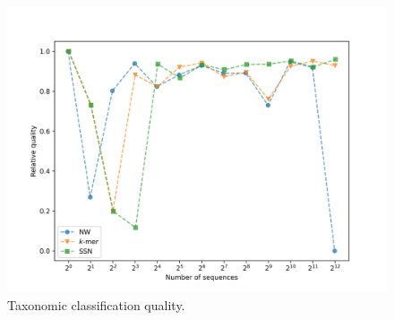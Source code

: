 \documentclass{article}
\begin{document}
                \begin{figure}[!htb]
                    \begin{center}
                        \includegraphics[width=\textwidth]{pictures/experiment_quality.png}
                    \end{center}
                    \caption{
                        Taxonomic classification quality.
                    }\label{Picture:Experiment:Quality}
                \end{figure}
\end{document}
